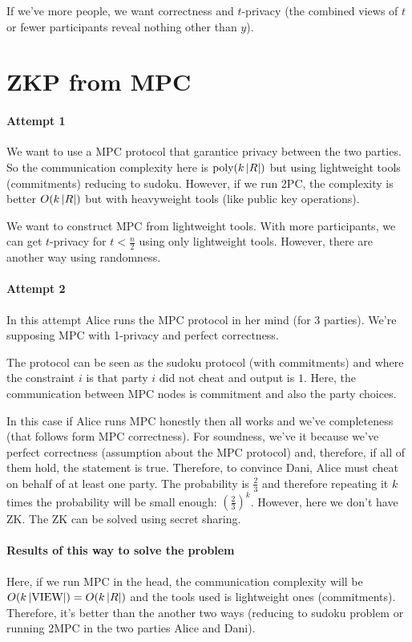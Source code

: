   If we've more people, we want correctness and $t$-privacy (the combined views of 
  $t$ or fewer participants reveal nothing other than $y$).

  \section{ZKP from MPC}
  \paragraph{Attempt 1}
  We want to use a MPC protocol that garantice privacy between the two parties.
  So the communication complexity here is $\text{poly}(k\left| R \right|)$ but using lightweight
  tools (commitments) reducing to sudoku.
  However, if we run 2PC, the complexity is better $O(k\left| R \right|)$ but with heavyweight
  tools (like public key operations).

  We want to construct MPC from lightweight tools.
  With more participants, we can get $t$-privacy for $t < \frac{n}{2}$ using only 
  lightweight tools.
  However, there are another way using randomness.

  \paragraph{Attempt 2}
  In this attempt Alice runs the MPC protocol in her mind (for 3 parties).
  We're supposing MPC with 1-privacy and perfect correctness.

  The protocol can be seen as the sudoku protocol (with commitments) and where the 
  constraint $i$ is that party $i$ did not cheat and output is $1$.
  Here, the communication between MPC nodes is commitment and also the party choices.

  In this case if Alice runs MPC honestly then all works and we've completeness (that 
  follows form MPC correctness).
  For soundness, we've it because we've perfect correctness (assumption about the 
  MPC protocol) and, therefore, if all of them hold, the statement is true.
  Therefore, to convince Dani, Alice must cheat on behalf of at least one party.
  The probability is $\frac{2}{3}$ and therefore repeating it $k$ times the probability will
  be small enough: $\left(\frac{2}{3}\right)^k$.
  However, here we don't have ZK.
  The ZK can be solved using secret sharing.

  \paragraph{Results of this way to solve the problem}
  Here, if we run MPC in the head, the communication complexity will be $O(k\left| \text{VIEW} \right|) = O(k\left| R \right|)$
  and the tools used is lightweight ones (commitments).
  Therefore, it's better than the another two ways (reducing to sudoku problem 
  or running 2MPC in the two parties Alice and Dani).

